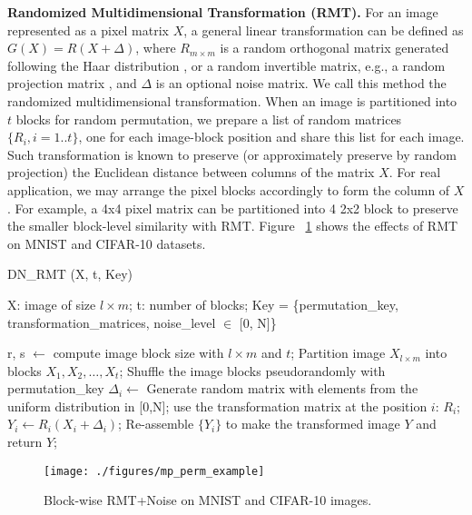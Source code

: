 \documentclass[conference]{IEEEtran}
\begin{document}
\textbf{Randomized Multidimensional Transformation (RMT).} For an image represented as a pixel matrix $X$, a general linear transformation can be defined as $G(X) = R(X+\Delta)$, where $R_{ m \times m}$ is a random orthogonal matrix generated following the Haar distribution \cite{gallier00}, or a random invertible matrix, e.g., a random projection matrix \cite{vempala05}, and $\Delta$ is an optional noise matrix. We call this method the randomized multidimensional transformation. When an image is partitioned into $t$ blocks for random permutation, we prepare a list of random matrices $\{R_i, i=1..t\}$, one for each image-block position and share this list for each image. Such transformation is known to preserve (or approximately preserve by random projection) the Euclidean distance between columns of the matrix $X$. For real application, we may arrange the pixel blocks accordingly to form the column of $X$. For example, a 4x4 pixel matrix can be partitioned into 4 2x2 block to preserve the smaller block-level similarity with RMT. Figure ~\ref{fig:disguises} shows the effects of RMT on MNIST and CIFAR-10 datasets. %

\begin{algorithm}
\caption{DN\_RMT (X, t, Key)}\label{alg:rmt}
\begin{algorithmic}[1]
\Require X: image of size $l \times m$; t: number of blocks; Key = \{permutation\_key, transformation\_matrices, noise\_level $\in$ [0, N]\} 

\State r, s $\leftarrow$ compute image block size with $l\times m$ and $t$;
\State Partition image $X_{l \times m}$ into blocks $X_1, X_2,\ldots, X_t$;
\State Shuffle the image blocks pseudorandomly with permutation\_key 
	\State $\Delta_i \leftarrow$  Generate random matrix with elements from the uniform distribution in [0,N];
	\State use the transformation matrix at the position $i$: $R_i$;
	\State $Y_i \leftarrow  R_i(X_i + \Delta_i)$;
\EndFor
\State Re-assemble $\{Y_i\}$ to make the transformed image $Y$ and return $Y$;
\end{algorithmic}
\end{algorithm}


\begin{figure}[h]
  \centering
    \texttt{[image: ./figures/mp\_perm\_example]}
   \caption{Block-wise RMT+Noise on MNIST and CIFAR-10 images. }
  \label{fig:disguises}
\end{figure}
\end{document}
